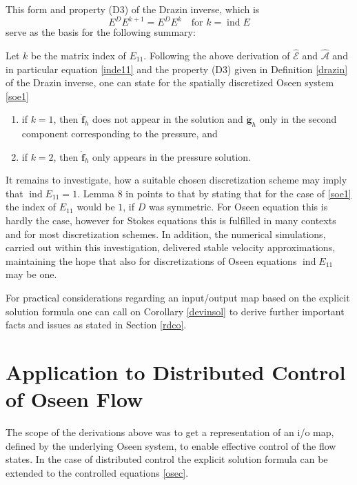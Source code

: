 \documentclass[a4paper,10pt,BCOR=15mm]{scrbook}
\DeclareMathOperator{\ind}{ind}
\begin{document}
This form and property (D3) of the Drazin inverse, which is 
\begin{equation*}
            E^DE^{k+1} = E^DE^k \quad \text{for  }k=\ind E
 \end{equation*}
serve as the basis for the following summary: 

\begin{prop}\label{devinsol}
Let $k$ be the matrix index of $E_{11}$. Following the above derivation of $\hat{ \mathcal E}$ and $\hat{\mathcal{A}}$ and in particular equation \eqref{inde11} and the property (D3) given in Definition \ref{drazin} of the Drazin inverse, one can state for the spatially discretized Oseen system \eqref{soe1}
\begin{enumerate}
 \item  if $k=1$, then $\dot{\mathbf f}_h$ does not appear in the solution and $\dot{\mathbf g}_h$ only in the second component corresponding to the pressure, and
\item if $k=2$, then $\dot{\mathbf f}_h$ only appears in the pressure solution.
\end{enumerate}
\end{prop}

It remains to investigate, how a suitable chosen discretization scheme may imply that $\ind E_{11} = 1$. Lemma 8 in \cite{emme} points to that by stating that for the case of \eqref{soe1} the index of $E_{11}$ would be $1$, if $D$ was symmetric. For Oseen equation this is hardly the case, however for Stokes equations this is fulfilled in many contexts and for most discretization schemes. In addition, the numerical simulations, carried out within this investigation, delivered stable velocity approximations, maintaining the hope that also for discretizations of Oseen equations $\ind E_{11}$ may be one.

For practical considerations regarding an input/output map based on the explicit solution formula one can call on Corollary \ref{devinsol} to derive further important facts and issues as stated in Section \ref{rdco}.

\section[Application to Distributed Control of Oseen]{Application to Distributed Control of Oseen Flow}
The scope of the derivations above was to get a representation of an i/o map, defined by the underlying Oseen system, to enable effective control of the flow states. In the case of distributed control the explicit solution formula can be extended to the controlled equations \eqref{osec}. 
\end{document}
